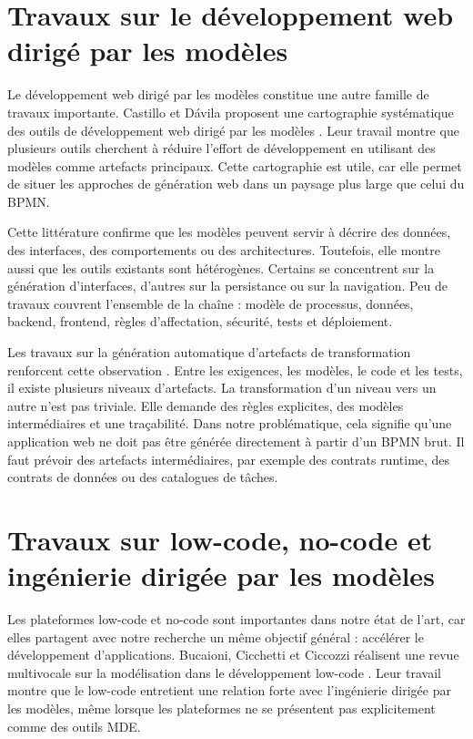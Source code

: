 \documentclass[12pt,a4paper]{article}
\begin{document}
\section{Travaux sur le développement web dirigé par les modèles}

Le développement web dirigé par les modèles constitue une autre famille de travaux importante. Castillo et Dávila proposent une cartographie systématique des outils de développement web dirigé par les modèles \cite{castillo2024}. Leur travail montre que plusieurs outils cherchent à réduire l'effort de développement en utilisant des modèles comme artefacts principaux. Cette cartographie est utile, car elle permet de situer les approches de génération web dans un paysage plus large que celui du BPMN.

Cette littérature confirme que les modèles peuvent servir à décrire des données, des interfaces, des comportements ou des architectures. Toutefois, elle montre aussi que les outils existants sont hétérogènes. Certains se concentrent sur la génération d'interfaces, d'autres sur la persistance ou sur la navigation. Peu de travaux couvrent l'ensemble de la chaîne : modèle de processus, données, backend, frontend, règles d'affectation, sécurité, tests et déploiement.

Les travaux sur la génération automatique d'artefacts de transformation renforcent cette observation \cite{frontiers2023}. Entre les exigences, les modèles, le code et les tests, il existe plusieurs niveaux d'artefacts. La transformation d'un niveau vers un autre n'est pas triviale. Elle demande des règles explicites, des modèles intermédiaires et une traçabilité. Dans notre problématique, cela signifie qu'une application web ne doit pas être générée directement à partir d'un BPMN brut. Il faut prévoir des artefacts intermédiaires, par exemple des contrats runtime, des contrats de données ou des catalogues de tâches.

\section{Travaux sur low-code, no-code et ingénierie dirigée par les modèles}

Les plateformes low-code et no-code sont importantes dans notre état de l'art, car elles partagent avec notre recherche un même objectif général : accélérer le développement d'applications. Bucaioni, Cicchetti et Ciccozzi réalisent une revue multivocale sur la modélisation dans le développement low-code \cite{bucaioni2022}. Leur travail montre que le low-code entretient une relation forte avec l'ingénierie dirigée par les modèles, même lorsque les plateformes ne se présentent pas explicitement comme des outils MDE.
\end{document}
